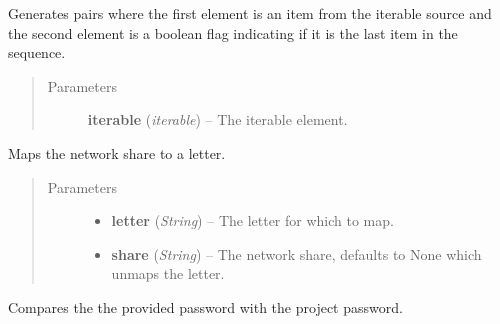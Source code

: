\documentclass[letterpaper,10pt,english]{sphinxmanual}
\begin{document}

\begin{fulllineitems}
\label{utils:utils.IterIsLast}
Generates pairs where the first element is an item from the iterable
source and the second element is a boolean flag indicating if it is the
last item in the sequence.
\begin{quote}\begin{description}
\item[{Parameters}] \leavevmode
\textbf{iterable} (\emph{iterable}) -- The iterable element.

\end{description}\end{quote}

\end{fulllineitems}


\begin{fulllineitems}
\label{utils:utils.MapNetworkShare}
Maps the network share to a letter.
\begin{quote}\begin{description}
\item[{Parameters}] \leavevmode\begin{itemize}
\item {} 
\textbf{letter} (\emph{String}) -- The letter for which to map.

\item {} 
\textbf{share} (\emph{String}) -- The network share, defaults to None which unmaps the letter.

\end{itemize}

\end{description}\end{quote}

\end{fulllineitems}


\begin{fulllineitems}
\label{utils:utils.check_project_password}
Compares the the provided password with the project password.

\end{fulllineitems}
\end{document}
